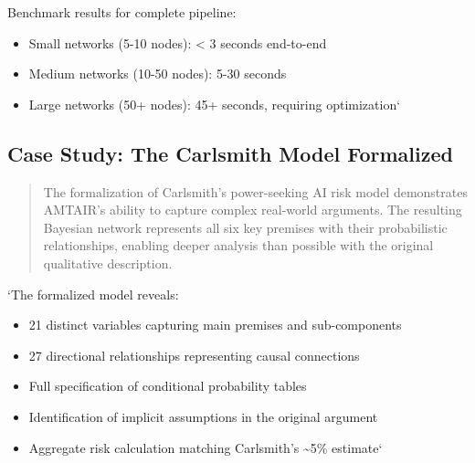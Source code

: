 \documentclass[12pt,a4paper]{report}
\providecommand{\tightlist}{%
  \setlength{\itemsep}{0pt}\setlength{\parskip}{0pt}}
\begin{document}
Benchmark results for complete pipeline:

\begin{itemize}
\tightlist
\item
  Small networks (5-10 nodes): \textless{} 3 seconds end-to-end
\item
  Medium networks (10-50 nodes): 5-30 seconds
\item
  Large networks (50+ nodes): 45+ seconds, requiring optimization`
\end{itemize}

\subsection{Case Study: The Carlsmith Model
Formalized}\label{sec-carlsmith-case-study}

\begin{quote}
The formalization of Carlsmith's power-seeking AI risk model
demonstrates AMTAIR's ability to capture complex real-world arguments.
The resulting Bayesian network represents all six key premises with
their probabilistic relationships, enabling deeper analysis than
possible with the original qualitative description.
\end{quote}

`The formalized model reveals:

\begin{itemize}
\tightlist
\item
  21 distinct variables capturing main premises and sub-components
\item
  27 directional relationships representing causal connections
\item
  Full specification of conditional probability tables
\item
  Identification of implicit assumptions in the original argument
\item
  Aggregate risk calculation matching Carlsmith's \textasciitilde5\%
  estimate`
\end{itemize}
\end{document}
